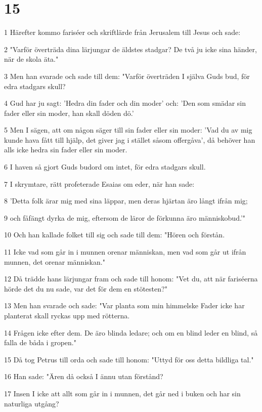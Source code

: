 \chapter{15}

\par 1 Härefter kommo fariséer och skriftlärde från Jerusalem till Jesus och sade:
\par 2 "Varför överträda dina lärjungar de äldstes stadgar? De två ju icke sina händer, när de skola äta."
\par 3 Men han svarade och sade till dem: "Varför överträden I själva Guds bud, för edra stadgars skull?
\par 4 Gud har ju sagt: 'Hedra din fader och din moder' och: 'Den som smädar sin fader eller sin moder, han skall döden dö.'
\par 5 Men I sägen, att om någon säger till sin fader eller sin moder: 'Vad du av mig kunde hava fått till hjälp, det giver jag i stället såsom offergåva', då behöver han alls icke hedra sin fader eller sin moder.
\par 6 I haven så gjort Guds budord om intet, för edra stadgars skull.
\par 7 I skrymtare, rätt profeterade Esaias om eder, när han sade:
\par 8 'Detta folk ärar mig med sina läppar, men deras hjärtan äro långt ifrån mig;
\par 9 och fåfängt dyrka de mig, eftersom de läror de förkunna äro människobud.'"
\par 10 Och han kallade folket till sig och sade till dem: "Hören och förstån.
\par 11 Icke vad som går in i munnen orenar människan, men vad som går ut ifrån munnen, det orenar människan."
\par 12 Då trädde hans lärjungar fram och sade till honom: "Vet du, att när fariséerna hörde det du nu sade, var det för dem en stötesten?"
\par 13 Men han svarade och sade: "Var planta som min himmelske Fader icke har planterat skall ryckas upp med rötterna.
\par 14 Frågen icke efter dem. De äro blinda ledare; och om en blind leder en blind, så falla de båda i gropen."
\par 15 Då tog Petrus till orda och sade till honom: "Uttyd för oss detta bildliga tal."
\par 16 Han sade: "Ären då också I ännu utan förstånd?
\par 17 Insen I icke att allt som går in i munnen, det går ned i buken och har sin naturliga utgång?
